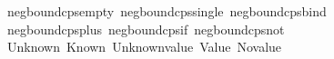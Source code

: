 \begin{isabellebody}
\ \ neg{\isacharunderscore}{\kern0pt}bound{\isacharunderscore}{\kern0pt}cps{\isacharunderscore}{\kern0pt}empty\ neg{\isacharunderscore}{\kern0pt}bound{\isacharunderscore}{\kern0pt}cps{\isacharunderscore}{\kern0pt}single\ neg{\isacharunderscore}{\kern0pt}bound{\isacharunderscore}{\kern0pt}cps{\isacharunderscore}{\kern0pt}bind\isanewline
\ \ neg{\isacharunderscore}{\kern0pt}bound{\isacharunderscore}{\kern0pt}cps{\isacharunderscore}{\kern0pt}plus\ neg{\isacharunderscore}{\kern0pt}bound{\isacharunderscore}{\kern0pt}cps{\isacharunderscore}{\kern0pt}if\ neg{\isacharunderscore}{\kern0pt}bound{\isacharunderscore}{\kern0pt}cps{\isacharunderscore}{\kern0pt}not\isanewline
\ \ Unknown\ Known\ Unknown{\isacharunderscore}{\kern0pt}value\ Value\ No{\isacharunderscore}{\kern0pt}value\isanewline
%
\isadelimtheory
\isanewline
%
\endisadelimtheory
%
\isatagtheory
{}\isamarkupfalse%
%
\endisatagtheory
{\isafoldtheory}%
%
\isadelimtheory
%
\endisadelimtheory
%
\end{isabellebody}%
\endinput

